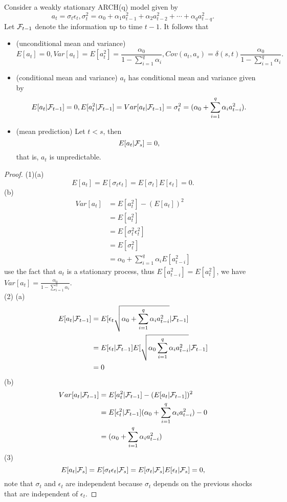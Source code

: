 \begin{theorem}\cite[118]{tsay2005analysis}
	Consider a weakly stationary ARCH(q) model given by
	$$a_t = \sigma_t \epsilon_t, \sigma_t^2 = \alpha_0 + \alpha_1a_{t-1}^2 + \alpha_2 a_{t-2}^2 + \cdots + \alpha_q a_{t-q}^2.$$
	Let $\mathcal{F}_{t-1}$ denote the information up to time $t-1$. It follows that
	\begin{itemize}
		\item (unconditional mean and variance)
		$$E[a_t] = 0, Var[a_t] = E[a_t^2] = \frac{\alpha_0}{1 - \sum_{i=1}^q\alpha_i},Cov(a_t,a_s) = \delta(s,t) \frac{\alpha_0}{1 - \sum_{i=1}^q\alpha_i}.$$
		\item (conditional mean and variance) $a_t$ has conditional mean and variance given by
		$$E[a_t|\mathcal{F}_{t-1}] = 0, E[a_t^2|\mathcal{F}_{t-1}]  = Var[a_t|\mathcal{F}_{t-1}] = \sigma_t^2 = (\alpha_0 + \sum_{i=1}^q\alpha_i a_{t-i}^2).$$
		\item (mean prediction) Let $t < s$, then 
		$$E[a_t|\mathcal{F}_s] = 0,$$
		that is, $a_t$ is unpredictable.
	\end{itemize}
\end{theorem}
\begin{proof}
	(1)(a) $$E[a_t] = E[\sigma_t\epsilon_t]=E[\sigma_t]E[\epsilon_t] = 0.$$
	(b) \begin{align*}
	Var[a_t] &= E[a_t^2] - (E[a_t])^2\\
	&=E[a_t^2] \\
	&=E[\sigma_t^2\epsilon_t^2]\\
	&=E[\sigma_t^2]\\
	&=\alpha_0 + \sum_{i=1}^q\alpha_i E[a_{t-i}^2]
	\end{align*}
	use the fact that $a_t$ is a stationary process, thus $E[a_{t-i}^2] = E[a_t^2]$, we have $Var[a_t] = \frac{\alpha_0}{1-\sum_{i=1}^q\alpha_i}$.\\
	(2)
	(a)
	\begin{align*}
	E[a_t|\mathcal{F}_{t-1}] &= E[\epsilon_{t}\sqrt{\alpha_0 + \sum_{i=1}^q\alpha_i a_{t-i}^2}|\mathcal{F}_{t-1}] \\
	&= E[\epsilon_t|\mathcal{F}_{t-1}]E[\sqrt{\alpha_0 \sum_{i=1}^q\alpha_i a_{t-i}^2}|\mathcal{F}_{t-1}] \\
	&= 0
	\end{align*}
	(b)
	\begin{align*}
	Var[a_t|\mathcal{F}_{t-1}] &= E[a_t^2|\mathcal{F}_{t-1}] - (E[a_t|\mathcal{F}_{t-1}])^2 \\
	&= E[\epsilon_t^2|\mathcal{F}_{t-1}](\alpha_0 + \sum_{i=1}^q\alpha_i a_{t-i}^2) - 0 \\
	&= (\alpha_0 + \sum_{i=1}^q\alpha_i a_{t-i}^2)
	\end{align*}
	(3) 
	$$E[a_t|\mathcal{F}_s] = E[\sigma_t \epsilon_t|\mathcal{F}_s] = E[\sigma_t|\mathcal{F}_s]E[ \epsilon_t|\mathcal{F}_s] = 0,$$
	note that $\sigma_t$ and $\epsilon_t$ are independent because $\sigma_t$ depends on the previous shocks that are independent of $\epsilon_t$.
\end{proof}


